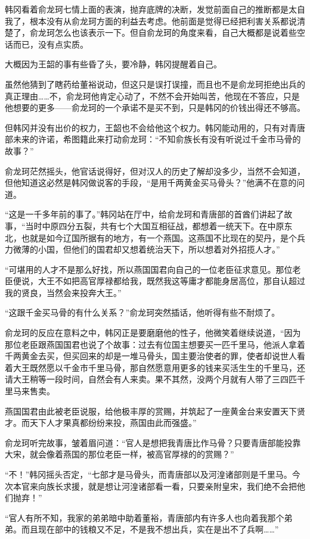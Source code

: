 韩冈看着俞龙珂七情上面的表演，抛弃底牌的决断，发觉前面自己的推断都是太自我了，根本没有从俞龙珂方面的利益去考虑。他前面是觉得已经把利害关系都说清楚了，俞龙珂怎么也该表示一下。但自俞龙珂的角度来看，自己大概都是说着些空话而已，没有点实质。

大概因为王韶的事有些昏了头，要冷静，韩冈提醒着自己。

虽然他猜到了瞎药给董裕说动，但这只是误打误撞，而且也不是俞龙珂拒绝出兵的真正理由……不，俞龙珂他肯定心动了，不然不会开始叫苦，他现在不答应，只是他想要的更多——俞龙珂的一个承诺不是买不到，只是韩冈的价钱出得还不够高。

但韩冈并没有出价的权力，王韶也不会给他这个权力。韩冈能动用的，只有对青唐部未来的许诺，希图籍此来打动俞龙珂：“不知俞族长有没有听说过千金市马骨的故事？”

俞龙珂茫然摇头，他官话说得好，但对汉人的历史了解却没多少，当然不会知道，但他知道这必然是韩冈做说客的手段，“是用千两黄金买马骨头？”他满不在意的问道。

“这是一千多年前的事了。”韩冈站在厅中，给俞龙珂和青唐部的首酋们讲起了故事，“当时中原四分五裂，共有七个大国互相征战，都想着一统天下。在中原东北，也就是如今辽国所据有的地方，有一个燕国。这燕国不比现在的契丹，是个兵力微薄的小国，但他们的国君却又想着统治天下，所以想着对外招揽人才。”

“可堪用的人才不是那么好找，所以燕国国君向自己的一位老臣征求意见。那位老臣便说，大王不如把高官厚禄都给我，既然我这等庸才都能身居高位，那自认超过我的贤良，当然会来投奔大王。”

“这跟千金买马骨的有什么关系？”俞龙珂突然插话，他听得有些不耐烦了。

俞龙珂的反应在意料之中，韩冈正是要磨磨他的性子，他微笑着继续说道，“因为那位老臣跟燕国国君也说了个故事：过去有位国主想要买一匹千里马，他派人拿着千两黄金去买，但买回来的却是一堆马骨头，国主要治使者的罪，使者却说世人看着大王既然愿以千金市千里马骨，那自然愿意用更多的钱来买活生生的千里马，还请大王稍等一段时间，自然会有人来卖。果不其然，没两个月就有人带了三四匹千里马来售卖。

燕国国君由此被老臣说服，给他极丰厚的赏赐，并筑起了一座黄金台来安置天下贤才。而天下人才果真都纷纷来投，燕国由此而强盛。”

俞龙珂听完故事，皱着眉问道：“官人是想把我青唐比作马骨？只要青唐部能投靠大宋，就会像着燕国的那位老臣一样，被高官厚禄的的赏赐？”

“不！”韩冈摇头否定，“七部才是马骨头，而青唐部以及河湟诸部则是千里马。今次本官来向族长求援，就是想让河湟诸部看一看，只要亲附皇宋，我们绝不会把他们抛弃！”

“官人有所不知，我家的弟弟暗中助着董裕，青唐部内有许多人也向着我那个弟弟。而且现在部中的钱粮又不足，不是我不想出兵，实在是出不了兵啊……”


